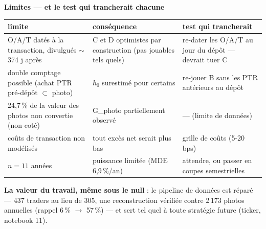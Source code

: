 \documentclass[10pt,a4paper,landscape]{article}
\begin{document}
\begin{minipage}[t]{0.50\textwidth}\vspace{0pt}
\textbf{Limites --- et le test qui trancherait chacune}
\begin{center}\small
\begin{tabularx}{\linewidth}{@{}XXX@{}}
\toprule
limite & conséquence & test qui trancherait \\
\midrule
O/A/T datés à la transaction, divulgués $\sim$374 j après & C et D optimistes par construction (pas jouables tels quels) & re-dater les O/A/T au jour du dépôt --- devrait tuer C \\
double comptage possible (achat PTR pré-dépôt $\subset$ photo) & $h_0$ surestimé pour certains & re-jouer B sans les PTR antérieurs au dépôt \\
24,7\,\% de la valeur des photos non convertie (non-coté) & G\_photo partiellement observé & --- (limite de données) \\
coûts de transaction non modélisés & tout excès net serait plus bas & grille de coûts (5-20 bps) \\
$n = 11$ années & puissance limitée (MDE 6,9\,\%/an) & attendre, ou passer en coupes semestrielles \\
\bottomrule
\end{tabularx}
\end{center}

\vspace{1mm}
\textbf{La valeur du travail, même sous le null} : le pipeline de données est réparé --- 437 traders au lieu de 305, une reconstruction vérifiée contre 2\,173 photos annuelles (rappel 6\,\% $\to$ 57\,\%) --- et sert tel quel à toute stratégie future (ticker, notebook 11).
\end{minipage}
\end{document}
